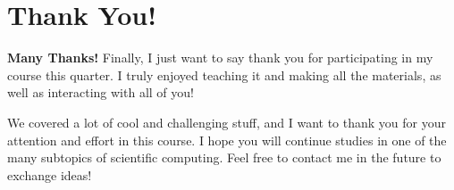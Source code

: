 \documentclass[xcolor=dvipsnames]{beamer}
\begin{document}
\section{Thank You!}
\begin{frame}
{\bf Many Thanks!}
Finally, I just want to say thank you for participating in my course this quarter. I truly enjoyed teaching it and making all the materials, as well as interacting with all of you! \vfill \pause

We covered a lot of cool and challenging stuff, and I want to thank you for your attention and effort in this course. I hope you will continue studies in one of the many subtopics of scientific computing. Feel free to contact me in the future to exchange ideas!
\end{frame}
\end{document}
